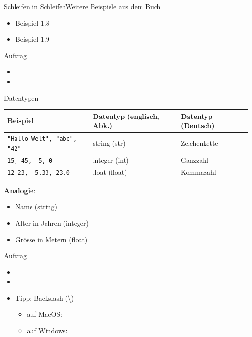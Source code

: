 \begin{frame}[fragile]{Schleifen in Schleifen}{Weitere Beispiele aus dem Buch}
\begin{itemize}
\item Beispiel 1.8
\item Beispiel 1.9
\end{itemize}
\end{frame}

\begin{frame}[fragile]{Auftrag}
\begin{itemize}
\item {}
\item {}
\end{itemize}
\end{frame}

\begin{frame}[fragile]{Datentypen}
\begin{table}[H]
\footnotesize
\centering
\begin{tabular}{l|p{2cm}|p{2cm}}
\textbf{Beispiel} & \textbf{Datentyp (englisch, Abk.)} & \textbf{Datentyp (Deutsch)} \\\midrule\midrule
\lstinline[style=TigerJython]|"Hallo Welt", "abc", "42"| & string (str) & Zeichenkette \\\midrule
\lstinline[style=TigerJython]|15, 45, -5, 0| & integer (int) & Ganzzahl \\\midrule
\lstinline[style=TigerJython]|12.23, -5.33, 23.0| & float (float) & Kommazahl
\end{tabular}
\end{table}

\textbf{Analogie}:
\begin{itemize}
\item Name (string)
\item Alter in Jahren (integer)
\item Grösse in Metern (float)
\end{itemize}
\end{frame}

\begin{frame}[fragile]{Auftrag}
\begin{itemize}
\item {}
\item {}
\item Tipp: Backslash (\textbackslash) 
\begin{itemize}
\item auf MacOS: 
\item auf Windows: \keys{\AltGr+\textbackslash}
\end{itemize}
\end{itemize}
\end{frame}